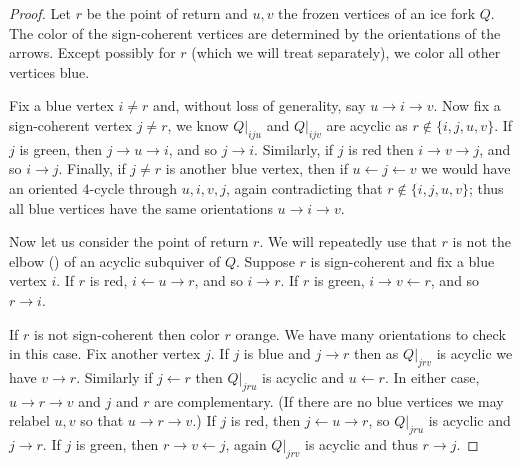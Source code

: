 \documentclass[12pt]{amsart}
\theoremstyle{definition}
\theoremstyle{remark}
\numberwithin{equation}{section}
\begin{document}
\begin{proof}
Let $r$ be the point of return and $u,v$ the frozen vertices of an ice fork $Q$.
The color of the sign-coherent vertices are determined by the orientations of the arrows. 
Except possibly for $r$ (which we will treat separately), we color all other vertices blue.

Fix a blue vertex $i \neq r$ and, without loss of generality, say $u \rightarrow i \rightarrow v$. 
Now fix a sign-coherent vertex $j\neq r$, we know $Q|_{iju}$ and $Q|_{ijv}$ are acyclic as $r\not \in \{i,j,u,v\}$.
If $j$ is green, then $j \rightarrow u \rightarrow i$, and so $j \rightarrow i$. 
Similarly, if $j$ is red then $i \rightarrow v \rightarrow j$, and so $i \rightarrow j$. 
Finally, if $j\neq r$ is another blue vertex, then if $u \leftarrow j \leftarrow v$ we would have an oriented $4$-cycle through $u,i,v,j$, again contradicting that $r \not \in \{i,j,u,v\}$; thus all blue vertices have the same orientations $u \rightarrow i \rightarrow v$.

Now let us consider the point of return $r$.
We will repeatedly use that $r$ is not the elbow () of an acyclic subquiver of $Q$.
Suppose $r$ is sign-coherent and fix a blue vertex $i$.
If $r$ is red, $i \leftarrow u \rightarrow r$, and so $i \rightarrow r$.
If $r$ is green, $i \rightarrow v \leftarrow r$, and so $r \rightarrow i$.

If $r$ is not sign-coherent then color $r$ orange. We have many orientations to check in this case.
Fix another vertex $j$.
If $j$ is blue and $j \rightarrow r$ then as $Q|_{jrv}$ is acyclic we have $v \rightarrow r$. Similarly if $j \leftarrow r$ then $Q|_{jru}$ is acyclic and $u \leftarrow r$. In either case, $u \rightarrow r \rightarrow v$ and $j$ and $r$ are complementary. 
(If there are no blue vertices we may relabel $u,v$ so that $u \rightarrow r \rightarrow v$.)
If $j$ is red, then $j \leftarrow u \rightarrow r$, so $Q|_{jru}$ is acyclic and $j \rightarrow r$.
If $j$ is green, then $r \rightarrow v \leftarrow j$, again $Q|_{jrv}$ is acyclic and thus $r \rightarrow j$.
\end{proof}
\end{document}
